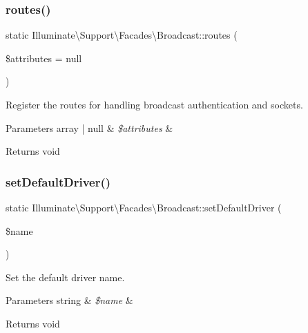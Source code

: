 \subsubsection{\texorpdfstring{routes()}{routes()}}
{\footnotesize\ttfamily static Illuminate\textbackslash{}\+Support\textbackslash{}\+Facades\textbackslash{}\+Broadcast\+::routes (\begin{DoxyParamCaption}\item[{}]{\$attributes = {\ttfamily null} }\end{DoxyParamCaption})\hspace{0.3cm}{\ttfamily [static]}}

Register the routes for handling broadcast authentication and sockets.


\begin{DoxyParams}[1]{Parameters}
array | null & {\em \$attributes} & \\
\hline
\end{DoxyParams}
\begin{DoxyReturn}{Returns}
void 
\end{DoxyReturn}
\mbox{\label{class_illuminate_1_1_support_1_1_facades_1_1_broadcast_ae7f1533413aa1c6235a5d581f042656f}} 
\subsubsection{\texorpdfstring{set\+Default\+Driver()}{setDefaultDriver()}}
{\footnotesize\ttfamily static Illuminate\textbackslash{}\+Support\textbackslash{}\+Facades\textbackslash{}\+Broadcast\+::set\+Default\+Driver (\begin{DoxyParamCaption}\item[{}]{\$name }\end{DoxyParamCaption})\hspace{0.3cm}{\ttfamily [static]}}

Set the default driver name.


\begin{DoxyParams}[1]{Parameters}
string & {\em \$name} & \\
\hline
\end{DoxyParams}
\begin{DoxyReturn}{Returns}
void 
\end{DoxyReturn}
\mbox{\label{class_illuminate_1_1_support_1_1_facades_1_1_broadcast_a6a4b121169824b3e5153107ad3d98044}} 
